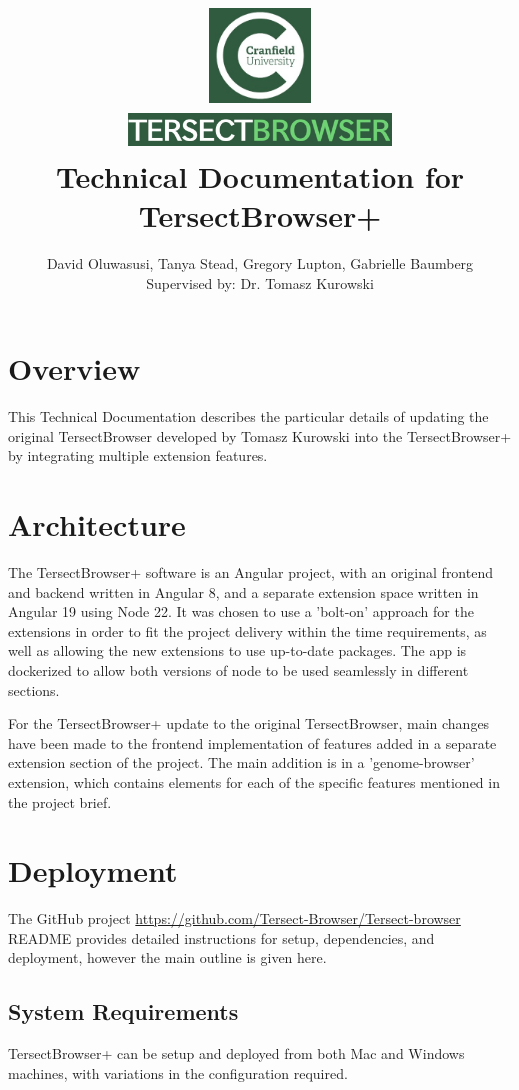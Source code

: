 \documentclass[12pt]{article}
\title{
{\includegraphics[width=3cm, height=2.5cm]{Cran.jpg}}
\\
\includegraphics[width=7cm, height=1cm]{TB.jpg}
\\
{Technical Documentation for TersectBrowser+}
}
\author{David Oluwasusi, Tanya Stead, Gregory Lupton, Gabrielle Baumberg \\ Supervised by: Dr. Tomasz Kurowski}
\begin{document}
\sloppy %

\maketitle

\section{Overview}
This Technical Documentation describes the particular details of updating the original TersectBrowser developed by Tomasz Kurowski into the TersectBrowser+ by integrating multiple extension features.

\section{Architecture}
The TersectBrowser+ software is an Angular project, with an original frontend and backend written in Angular 8, and a separate extension space written in Angular 19 using Node 22. It was chosen to use a 'bolt-on' approach for the extensions in order to fit the project delivery within the time requirements, as well as allowing the new extensions to use up-to-date packages. The app is dockerized to allow both versions of node to be used seamlessly in different sections.

For the TersectBrowser+ update to the original TersectBrowser, main changes have been made to the frontend implementation of features added in a separate extension section of the project. The main addition is in a 'genome-browser' extension, which contains elements for each of the specific features mentioned in the project brief. 

\section{Deployment}
The GitHub project \url{https://github.com/Tersect-Browser/Tersect-browser} README provides detailed instructions for setup, dependencies, and deployment, however the main outline is given here.

\subsection{System Requirements}
TersectBrowser+ can be setup and deployed from both Mac and Windows machines, with variations in the configuration required. 
\end{document}
